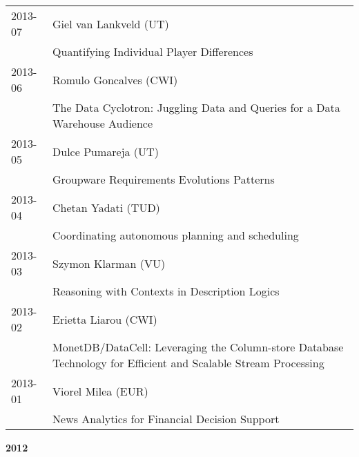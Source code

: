 \begin{longtable}{p{1.25cm}p{10.75cm}}
2013-07 & Giel van Lankveld (UT) \\& Quantifying Individual Player Differences \\
2013-06 & Romulo Goncalves (CWI) \\& The Data Cyclotron: Juggling Data and Queries for a Data Warehouse \newline Audience \\
2013-05 & Dulce Pumareja (UT) \\& Groupware Requirements Evolutions Patterns \\
2013-04 & Chetan Yadati (TUD) \\& Coordinating autonomous planning and scheduling \\
2013-03 & Szymon Klarman (VU) \\& Reasoning with Contexts in Description Logics \\
2013-02 & Erietta Liarou (CWI) \\& MonetDB/DataCell: Leveraging the Column-store Database Technology for Efficient and Scalable Stream Processing \\
2013-01 & Viorel Milea (EUR) \\& News Analytics for Financial Decision Support \\
\end{longtable}

\begin{center}
	\large{\textbf{2012}}
\end{center}

